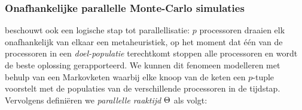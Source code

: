 \subsubsection{Onafhankelijke parallelle Monte-Carlo simulaties}

\cite{DBLP:journals/jc/ShonkwilerV94} beschouwt ook een logische stap tot parallellisatie: $p$ processoren draaien elk onafhankelijk van elkaar een metaheuristiek, op het moment dat \'e\'en van de processoren in een \emph{doel-populatie} terechtkomt stoppen alle processoren en wordt de beste oplossing gerapporteerd. We kunnen dit fenomeen modelleren met behulp van een Markovketen waarbij elke knoop van de keten een $p$-tuple voorstelt met de populaties van de verschillende processoren in de tijdstap. Vervolgens defini\"eren we \emph{parallelle raaktijd} $\Theta$ als volgt:

